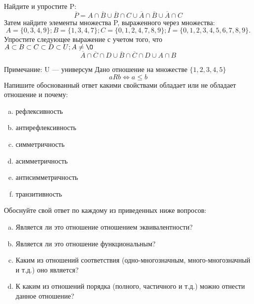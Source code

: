\documentclass[10pt]{exam}
\begin{document}
\begin{questions}
\question
Найдите и упростите P:
\begin{equation*}
\overline{P} = A \cap \overline{B} \cup \overline{B} \cap C \cup \overline{A} \cap \overline{B} \cup \overline{A} \cap C
\end{equation*}
Затем найдите элементы множества P, выраженного через множества:
\begin{equation*}
A = \{0, 3, 4, 9\}; 
B = \{1, 3, 4, 7\};
C = \{0, 1, 2, 4, 7, 8, 9\};
I = \{0, 1, 2, 3, 4, 5, 6, 7, 8, 9\}.
\end{equation*}\question
Упростите следующее выражение с учетом того, что $A\subset B \subset C \subset D \subset U; A \neq \O$
\begin{equation*}
\overline{A} \cap \overline{C} \cap D \cup \overline{B} \cap \overline{C} \cap D \cup A \cap B
\end{equation*}

Примечание: U — универсум\question
Дано отношение на множестве $\{1, 2, 3, 4, 5\}$ 
\begin{equation*}
aRb \iff a \leq b
\end{equation*}
Напишите обоснованный ответ какими свойствами обладает или не обладает отношение и почему:   
\begin{enumerate} [a)]\setcounter{enumi}{0}
\item рефлексивность
\item антирефлексивность
\item симметричность
\item асимметричность
\item антисимметричность
\item транзитивность
\end{enumerate}

Обоснуйте свой ответ по каждому из приведенных ниже вопросов:
\begin{enumerate} [a)]\setcounter{enumi}{0}
    \item Является ли это отношение отношением эквивалентности?
    \item Является ли это отношение функциональным?
    \item Каким из отношений соответствия (одно-многозначным, много-многозначный и т.д.) оно является?
    \item К каким из отношений порядка (полного, частичного и т.д.) можно отнести данное отношение?
\end{enumerate}



\end{questions}
\end{document}
